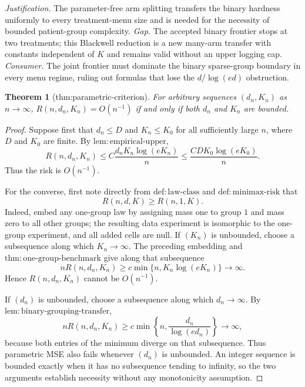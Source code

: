 \documentclass{article}
\newtheorem{theorem}{Theorem}
\begin{document}
\par\smallskip\noindent \textit{Justification.} The parameter-free arm splitting transfers the binary hardness uniformly to every treatment-menu size and is needed for the necessity of bounded patient-group complexity. \textit{Gap.} The accepted binary frontier stops at two treatments; this Blackwell reduction is a new many-arm transfer with constants independent of \(K\) and remains valid without an upper logging cap. \textit{Consumer.} The joint frontier must dominate the binary sparse-group boundary in every menu regime, ruling out formulas that lose the \(d/\log(ed)\) obstruction.

\begin{theorem}[thm:parametric-criterion]\label{thm:parametric-criterion}
For arbitrary sequences \((d_n,K_n)\) as \(n\to\infty\), \(R(n,d_n,K_n)=O(n^{-1})\) if and only if both \(d_n\) and \(K_n\) are bounded.
\end{theorem}
\begin{proof}
Suppose first that \(d_n\leq D\) and \(K_n\leq K_0\) for all sufficiently large \(n\), where \(D\) and \(K_0\) are finite.  By \(\mathrm{lem{:}empirical\text{-}upper}\),
\[
 R(n,d_n,K_n)
 \leq C\frac{d_nK_n\log(eK_n)}n
 \leq\frac{CDK_0\log(eK_0)}n.
\]
Thus the risk is \(O(n^{-1})\).

For the converse, first note directly from \(\mathrm{def{:}law\text{-}class}\) and \(\mathrm{def{:}minimax\text{-}risk}\) that
\[
 R(n,d,K)\geq R(n,1,K).
\]
Indeed, embed any one-group law by assigning mass one to group \(1\) and mass zero to all other groups; the resulting data experiment is isomorphic to the one-group experiment, and all added cells are null.  If \((K_n)\) is unbounded, choose a subsequence along which \(K_n\to\infty\).  The preceding embedding and \(\mathrm{thm{:}one\text{-}group\text{-}benchmark}\) give along that subsequence
\[
 nR(n,d_n,K_n)\geq c\min\{n,K_n\log(eK_n)\}\longrightarrow\infty.
\]
Hence \(R(n,d_n,K_n)\) cannot be \(O(n^{-1})\).

If \((d_n)\) is unbounded, choose a subsequence along which \(d_n\to\infty\).  By \(\mathrm{lem{:}binary\text{-}grouping\text{-}transfer}\),
\[
 nR(n,d_n,K_n)
 \geq c\min\left\{n,\frac{d_n}{\log(ed_n)}\right\}
 \longrightarrow\infty,
\]
because both entries of the minimum diverge on that subsequence.  Thus parametric MSE also fails whenever \((d_n)\) is unbounded.  An integer sequence is bounded exactly when it has no subsequence tending to infinity, so the two arguments establish necessity without any monotonicity assumption.
\end{proof}
\end{document}
